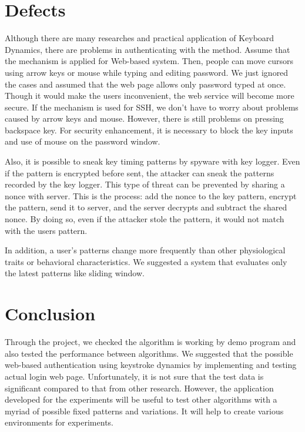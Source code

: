 \documentclass[twocolumn,showpacs,%
  nofootinbib,aps,%
  eqsecnum,prd,notitlepage,showkeys,10pt]{revtex4-1}
\begin{document}
\section{Defects}
Although there are many researches and practical application of Keyboard Dynamics, there are problems in authenticating with the method. Assume that the mechanism is applied for Web-based system. Then, people can move cursors using arrow keys or mouse while typing and editing password. We just ignored the cases and assumed that the web page allows only password typed at once. Though it would make the users inconvenient, the web service will become more secure. If the mechanism is used for SSH, we don't have to worry about problems caused by arrow keys and mouse. However, there is still problems on pressing backspace key. For security enhancement, it is necessary to block the key inputs and use of mouse on the password window.\par
Also, it is possible to sneak key timing patterns by spyware with key logger. Even if the pattern is encrypted before sent, the attacker can sneak the patterns recorded by the key logger. This type of threat can be prevented by sharing a nonce with server. This is the process: add the nonce to the key pattern, encrypt the pattern, send it to server, and the server decrypts and subtract the shared nonce. By doing so, even if the attacker stole the pattern, it would not match with the users pattern.\par
In addition, a user's patterns change more frequently than other physiological traits or behavioral characteristics. We suggested a system that evaluates only the latest patterns like sliding window.

\section{Conclusion}
Through the project, we checked the algorithm is working by demo program and also tested the performance between algorithms. We suggested that the possible web-based authentication using keystroke dynamics by implementing and testing actual login web page. Unfortunately, it is not sure that the test data is significant compared to that from other research. However, the application developed for the experiments will be useful to test other algorithms with a myriad of possible fixed patterns and variations. It will help to create various environments for experiments.



\end{document}
